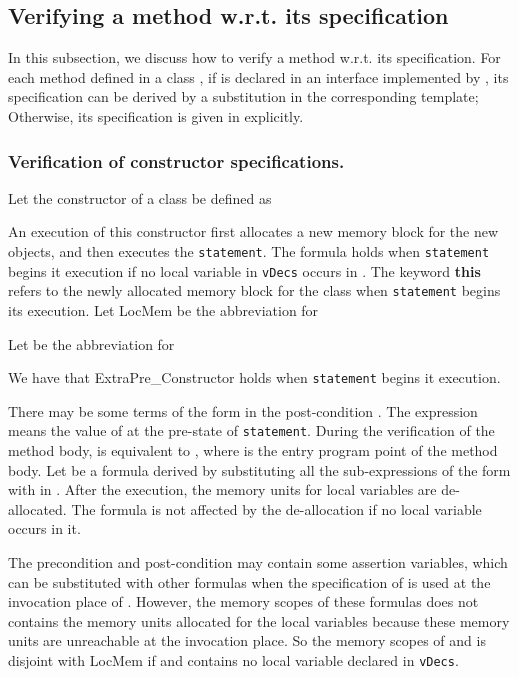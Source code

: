 \documentclass[fleqn]{llncs}
\begin{document}
\subsection{Verifying a method w.r.t. its specification}
In this subsection, we discuss how to verify a method w.r.t. its specification.
For each method  defined in a class , if  is declared in an interface implemented by , its specification can be derived by a substitution in
the corresponding template; Otherwise, its specification is given in  explicitly.

\subsubsection{Verification of constructor specifications.}
Let the constructor of a class  be defined as
    
An execution of this constructor first allocates a new memory block for the new objects, and then executes the \texttt{statement}.
The formula  holds when \texttt{statement} begins it execution if no local variable in \texttt{vDecs} occurs in .
The keyword \textbf{this} refers to the newly allocated memory block for the class  when \texttt{statement} begins its execution.
Let \textsf{LocMem} be the abbreviation for
    
Let  be the abbreviation for

We have that \textsf{ExtraPre\_Constructor} holds when \texttt{statement} begins it execution.

There may be some terms of the form  in the post-condition . The expression  means
the value of  at the pre-state of \texttt{statement}. During the verification of the method body,  is equivalent to
, where  is the entry program point of the method body.
Let  be a formula derived by substituting all the sub-expressions of the form  with  in .
After the execution, the memory units for local variables are de-allocated. The formula  is not affected by the de-allocation if no
local variable occurs in it.

The precondition  and post-condition  may contain some assertion variables, which can be substituted with other formulas when
the specification of  is used at the invocation place of . However, the memory scopes of these formulas does not contains the memory units
allocated for the local variables because these memory units are unreachable at the invocation place. So the memory scopes
of  and  is disjoint with \textsf{LocMem} if  and  contains no local variable declared in \texttt{vDecs}.
\end{document}
